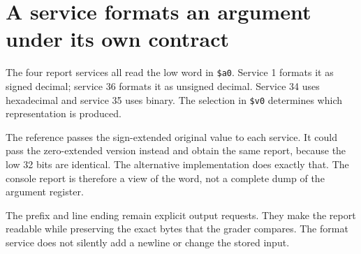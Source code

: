 \section{A service formats an argument under its own
  contract}\label{004-bit-inspector-p07-a-service-formats-an-argument-under-its-own-contract}

The four report services all read the low word in \texttt{\$a0}. Service
1 formats it as signed decimal; service 36 formats it as unsigned
decimal. Service 34 uses hexadecimal and service 35 uses binary. The
selection in \texttt{\$v0} determines which representation is produced.

The reference passes the sign-extended original value to each service.
It could pass the zero-extended version instead and obtain the same
report, because the low 32 bits are identical. The alternative
implementation does exactly that. The console report is therefore a view
of the word, not a complete dump of the argument register.

The prefix and line ending remain explicit output requests. They make
the report readable while preserving the exact bytes that the grader
compares. The format service does not silently add a newline or change
the stored input.
